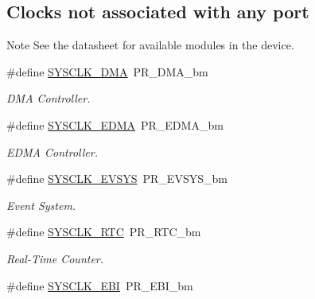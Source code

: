 \subsection*{Clocks not associated with any port}
\label{_amgrpd76b914abe2af93cd70050cd78a17adb}%
 \begin{DoxyNote}{Note}
See the datasheet for available modules in the device. 
\end{DoxyNote}
\begin{DoxyCompactItemize}
\item 
\hypertarget{group__sysclk__group_gae6300bff0b95a94a293c343359d29b29}{\#define \hyperlink{group__sysclk__group_gae6300bff0b95a94a293c343359d29b29}{S\-Y\-S\-C\-L\-K\-\_\-\-D\-M\-A}~P\-R\-\_\-\-D\-M\-A\-\_\-bm}\label{group__sysclk__group_gae6300bff0b95a94a293c343359d29b29}

\begin{DoxyCompactList}\small\item\em D\-M\-A Controller. \end{DoxyCompactList}\item 
\hypertarget{group__sysclk__group_ga5b0b12579b473c3419403c22fc2c0efe}{\#define \hyperlink{group__sysclk__group_ga5b0b12579b473c3419403c22fc2c0efe}{S\-Y\-S\-C\-L\-K\-\_\-\-E\-D\-M\-A}~P\-R\-\_\-\-E\-D\-M\-A\-\_\-bm}\label{group__sysclk__group_ga5b0b12579b473c3419403c22fc2c0efe}

\begin{DoxyCompactList}\small\item\em E\-D\-M\-A Controller. \end{DoxyCompactList}\item 
\hypertarget{group__sysclk__group_gaed9d475401acb4d84ff99e799085fcf8}{\#define \hyperlink{group__sysclk__group_gaed9d475401acb4d84ff99e799085fcf8}{S\-Y\-S\-C\-L\-K\-\_\-\-E\-V\-S\-Y\-S}~P\-R\-\_\-\-E\-V\-S\-Y\-S\-\_\-bm}\label{group__sysclk__group_gaed9d475401acb4d84ff99e799085fcf8}

\begin{DoxyCompactList}\small\item\em Event System. \end{DoxyCompactList}\item 
\hypertarget{group__sysclk__group_ga23965e6672f9e02ad222f104261acd1a}{\#define \hyperlink{group__sysclk__group_ga23965e6672f9e02ad222f104261acd1a}{S\-Y\-S\-C\-L\-K\-\_\-\-R\-T\-C}~P\-R\-\_\-\-R\-T\-C\-\_\-bm}\label{group__sysclk__group_ga23965e6672f9e02ad222f104261acd1a}

\begin{DoxyCompactList}\small\item\em Real-\/\-Time Counter. \end{DoxyCompactList}\item 
\hypertarget{group__sysclk__group_ga30be147da40e89c8ea7fa6fd0ed30129}{\#define \hyperlink{group__sysclk__group_ga30be147da40e89c8ea7fa6fd0ed30129}{S\-Y\-S\-C\-L\-K\-\_\-\-E\-B\-I}~P\-R\-\_\-\-E\-B\-I\-\_\-bm}\label{group__sysclk__group_ga30be147da40e89c8ea7fa6fd0ed30129}


\end{DoxyCompactItemize}

